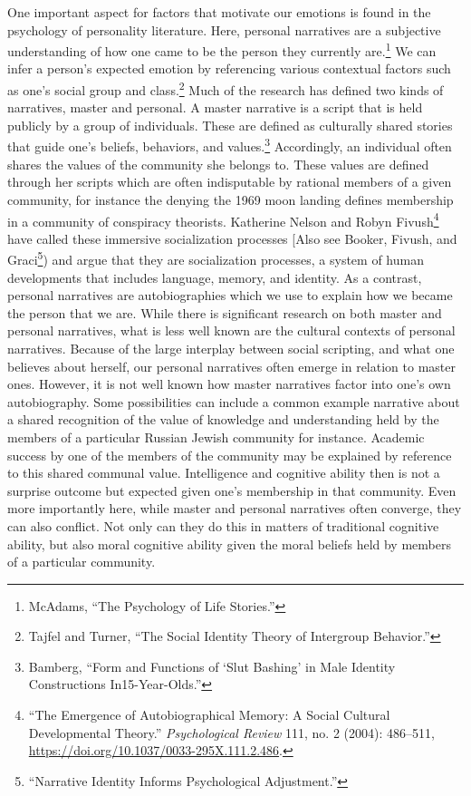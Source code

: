 \documentclass[phdthesis,12pt,final,a4paper]{wuthesis}
\theoremstyle{definition}
\theoremstyle{definition}
\theoremstyle{definition}
\theoremstyle{definition}
\theoremstyle{remark}
\begin{document}
One important aspect for factors that motivate our emotions is found in the psychology of personality literature. Here, personal narratives are a subjective understanding of how one came to be the person they currently are.\footnote{McAdams, {``The {Psychology} of {Life Stories}.''}} We can infer a person's expected emotion by referencing various contextual factors such as one's social group and class.\footnote{Tajfel and Turner, {``The {Social Identity Theory} of {Intergroup Behavior}.''}} Much of the research has defined two kinds of narratives, master and personal. A master narrative is a script that is held publicly by a group of individuals. These are defined as culturally shared stories that guide one's beliefs, behaviors, and values.\footnote{Bamberg, {``Form and {Functions} of {`{Slut Bashing}'} in {Male Identity Constructions} In15-{Year-Olds}.''}} Accordingly, an individual often shares the values of the community she belongs to. These values are defined through her scripts which are often indisputable by rational members of a given community, for instance the denying the 1969 moon landing defines membership in a community of conspiracy theorists. Katherine Nelson and Robyn Fivush\footnote{{``The {Emergence} of {Autobiographical Memory}: {A Social Cultural Developmental Theory}.''} \emph{Psychological Review} 111, no. 2 (2004): 486--511, \url{https://doi.org/10.1037/0033-295X.111.2.486}.} have called these immersive socialization processes {[}Also see Booker, Fivush, and Graci\footnote{{``Narrative Identity Informs Psychological Adjustment.''}}) and argue that they are socialization processes, a system of human developments that includes language, memory, and identity. As a contrast, personal narratives are autobiographies which we use to explain how we became the person that we are. While there is significant research on both master and personal narratives, what is less well known are the cultural contexts of personal narratives. Because of the large interplay between social scripting, and what one believes about herself, our personal narratives often emerge in relation to master ones. However, it is not well known how master narratives factor into one's own autobiography. Some possibilities can include a common example narrative about a shared recognition of the value of knowledge and understanding held by the members of a particular Russian Jewish community for instance. Academic success by one of the members of the community may be explained by reference to this shared communal value. Intelligence and cognitive ability then is not a surprise outcome but expected given one's membership in that community. Even more importantly here, while master and personal narratives often converge, they can also conflict. Not only can they do this in matters of traditional cognitive ability, but also moral cognitive ability given the moral beliefs held by members of a particular community.
\end{document}
